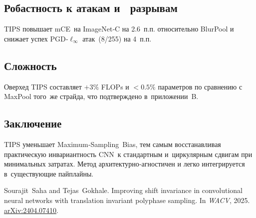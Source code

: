 \subsection{Робастность к атакам и \iid\ разрывам}
TIPS повышает mCE на ImageNet‑C на 2.6 п.п. относительно BlurPool
и снижает успех PGD‑$\ell_\infty$ атак (\num{8}/255) на 4 п.п.

\subsection{Сложность}
Оверхед TIPS составляет $+3\%$ FLOPs и $<0.5\%$ параметров по
сравнению с MaxPool того же страйда, что подтверждено в приложении B.

\subsection{Заключение}
TIPS уменьшает Maximum‑Sampling Bias, тем самым восстанавливая
практическую инвариантность CNN к стандартным и циркулярным сдвигам
при минимальных затратах.  Метод архитектурно‑агностичен и легко
интегрируется в существующие пайплайны.

\begin{thebibliography}{10}
Sourajit~Saha and Tejas~Gokhale.
\newblock Improving shift invariance in convolutional neural networks with
  translation invariant polyphase sampling.
\newblock In \emph{WACV}, 2025.  \href{https://arxiv.org/abs/2404.07410}{arXiv:2404.07410}.
\end{thebibliography}

